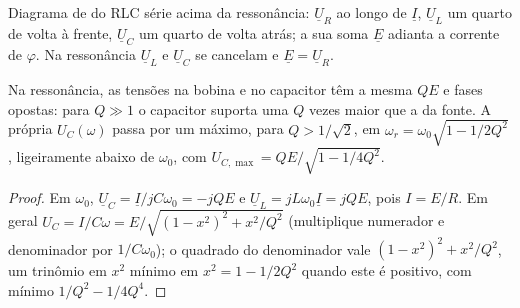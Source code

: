 \begin{omfigure}

{\small Diagrama de  do RLC série acima da ressonância: $\underline U_R$
ao longo de $\underline I$, $\underline U_L$ um quarto de volta à frente, $\underline U_C$
um quarto de volta atrás; a sua soma $\underline E$ adianta a corrente de
$\varphi$. Na ressonância $\underline U_L$ e $\underline U_C$ se cancelam e
$\underline E = \underline U_R$.}
\end{omfigure}

\begin{proposition}[Sobretensão]\label{prop:b1:sinusoidal-impedance:overvoltage}
Na ressonância, as tensões na bobina e no capacitor têm a
mesma  $QE$ e fases opostas: para $Q \gg 1$ o capacitor
suporta uma  $Q$ vezes maior que a da fonte. A própria 
$U_C(\omega)$ passa por um máximo, para $Q > 1/\sqrt2$, em $\omega_r =
\omega_0\sqrt{1 - 1/2Q^2}$, ligeiramente abaixo de $\omega_0$, com
$U_{C,\max} = QE/\sqrt{1 - 1/4Q^2}$.
\end{proposition}

\begin{proof}
Em $\omega_0$, $\underline U_C = \underline I/jC\omega_0 = -jQE$ e
$\underline U_L = jL\omega_0\underline I = jQE$, pois $I = E/R$. Em
geral $U_C = I/C\omega = E/\sqrt{(1 - x^2)^2 + x^2/Q^2}$ (multiplique
numerador e denominador por $1/C\omega_0$); o quadrado do denominador
vale $(1 - x^2)^2 + x^2/Q^2$, um trinômio em $x^2$ mínimo em $x^2 =
1 - 1/2Q^2$ quando este é positivo, com mínimo $1/Q^2 - 1/4Q^4$.
\end{proof}

